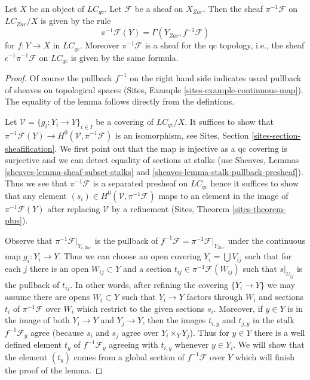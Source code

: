 \begin{lemma}
\label{lemma-describe-pullback-pi}
Let $X$ be an object of $\textit{LC}_{qc}$. Let $\mathcal{F}$ be a
sheaf on $X_{Zar}$. Then the sheaf $\pi^{-1}\mathcal{F}$ on
$\textit{LC}_{Zar}/X$ is given by the rule
$$
\pi^{-1}\mathcal{F}(Y) = \Gamma(Y_{Zar}, f^{-1}\mathcal{F})
$$
for $f : Y \to X$ in $\textit{LC}_{qc}$. Moreover $\pi^{-1}\mathcal{F}$
is a sheaf for the qc topology, i.e., the sheaf
$\epsilon^{-1}\pi^{-1}\mathcal{F}$ on $\textit{LC}_{qc}$
is given by the same formula.
\end{lemma}

\begin{proof}
Of course the pullback $f^{-1}$ on the right hand side indicates
usual pullback of sheaves on topological spaces
(Sites, Example \ref{sites-example-continuous-map}).
The equality of the lemma follows directly from the defintions.

\medskip\noindent
Let $\mathcal{V} = \{g_i : Y_i \to Y\}_{i \in I}$ be a covering of
$\textit{LC}_{qc}/X$. It suffices to show that
$\pi^{-1}\mathcal{F}(Y) \to H^0(\mathcal{V}, \pi^{-1}\mathcal{F})$
is an isomorphism, see Sites, Section \ref{sites-section-sheafification}.
We first point out that the map is injective as a qc covering
is surjective and we can detect equality of sections at stalks
(use Sheaves, Lemmas \ref{sheaves-lemma-sheaf-subset-stalks} and
\ref{sheaves-lemma-stalk-pullback-presheaf}). Thus we see that
$\pi^{-1}\mathcal{F}$ is a separated presheaf on $\textit{LC}_{qc}$
hence it suffices to show that any element
$(s_i) \in H^0(\mathcal{V}, \pi^{-1}\mathcal{F})$
maps to an element in the image of $\pi^{-1}\mathcal{F}(Y)$
after replacing $\mathcal{V}$ by a refinement
(Sites, Theorem \ref{sites-theorem-plus}).

\medskip\noindent
Observe that $\pi^{-1}\mathcal{F}|_{Y_{i, Zar}}$ is the pullback
of $f^{-1}\mathcal{F} = \pi^{-1}\mathcal{F}|_{Y_{Zar}}$ under
the continuous map $g_i : Y_i \to Y$. Thus we can choose an open covering
$Y_i = \bigcup V_{ij}$ such that for each $j$ there is an open
$W_{ij} \subset Y$ and a section $t_{ij} \in \pi^{-1}\mathcal{F}(W_{ij})$
such that $s|_{U_{ij}}$ is the pullback of $t_{ij}$. In other words,
after refining the covering $\{Y_i \to Y\}$ we may assume there
are opens $W_i \subset Y$ such that $Y_i \to Y$ factors through $W_i$
and sections $t_i$ of $\pi^{-1}\mathcal{F}$ over $W_i$ which restrict
to the given sections $s_i$. Moreover, if $y \in Y$ is in the image
of both $Y_i \to Y$ and $Y_j \to Y$, then the images $t_{i, y}$
and $t_{j, y}$ in the stalk $f^{-1}\mathcal{F}_y$ agree
(because $s_i$ and $s_j$ agree over $Y_i \times_Y Y_j$).
Thus for $y \in Y$ there is a well defined element $t_y$ of
$f^{-1}\mathcal{F}_y$ agreeing with $t_{i, y}$ whenever $y \in Y_i$.
We will show that the element $(t_y)$ comes from a global section
of $f^{-1}\mathcal{F}$ over $Y$ which will finish the proof of the lemma.


\end{proof}

